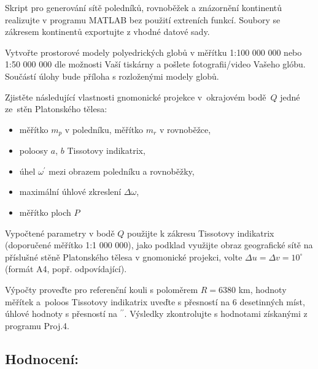\documentclass[12pt, a4paper]{article}
\begin{document}
\noindent Skript pro generování sítě poledníků, rovnoběžek a znázornění kontinentů realizujte v programu MATLAB bez použití extreních funkcí. Soubory se zákresem kontinentů exportujte z vhodné datové sady.
\vspace{3mm}

\noindent Vytvořte prostorové modely polyedrických globů v měřítku 1:100 000 000 nebo 1:50 000 000 dle možnosti Vaší tiskárny a pošlete fotografii/video Vašeho glóbu. Součástí úlohy bude příloha s rozloženými modely globů.
\vspace{3mm}

\noindent Zjistěte následující vlastnosti gnomonické projekce v~okrajovém bodě~$Q$ jedné ze~stěn Platonského tělesa:
\begin{itemize}
    \item měřítko $m_p$ v poledníku, měřítko $m_r$ v rovnoběžce,
    \item poloosy $a$, $b$ Tissotovy indikatrix,
    \item úhel $\omega^\prime$ mezi obrazem poledníku a rovnoběžky,
    \item maximální úhlové zkreslení $\Delta \omega$,
    \item měřítko ploch $P$
\end{itemize}

\noindent Vypočtené parametry v bodě $Q$ použijte k zákresu Tissotovy indikatrix (doporučené měřítko 1:1 000 000), jako podklad využijte obraz geografické sítě na příslušné stěně Platonského tělesa v gnomonické projekci, volte $\Delta u = \Delta v = 10^\circ$ (formát A4, popř. odpovídající).
\vspace{3mm}

\noindent Výpočty proveďte pro referenční kouli s poloměrem $R = 6380$ km, hodnoty měřítek a~poloos Tissotovy indikatrix uveďte s přesností na 6 desetinných míst, úhlové hodnoty s přesností na $^{\prime\prime}$. Výsledky zkontrolujte s hodnotami získanými z programu Proj.4. 

\vspace{1cm}
\subsection*{\textbf{Hodnocení:}}
\end{document}
